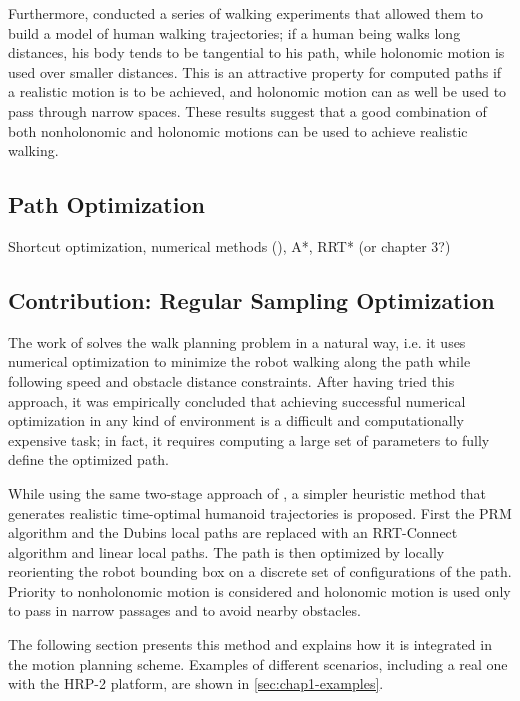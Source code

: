 Furthermore, \cite{momb10} conducted a series of walking experiments
that allowed them to build a model of human walking trajectories; if a
human being walks long distances, his body tends to be tangential to
his path, while holonomic motion is used over smaller distances. This
is an attractive property for computed paths if a realistic motion is
to be achieved, and holonomic motion can as well be used to pass
through narrow spaces. These results suggest that a good combination
of both nonholonomic and holonomic motions can be used to achieve
realistic walking.

\subsection{Path Optimization}
\label{subsec:chap1-path-optimization}

Shortcut optimization, numerical methods (), A*, RRT* (or chapter 3?)

\subsection{Contribution: Regular Sampling Optimization}
\label{subsec:chap1-contribution}
The work of \cite{moul10} solves the walk planning problem
in a natural way, i.e. it uses numerical optimization to minimize the
robot walking along the path while following speed and obstacle
distance constraints. After having tried this approach, it was
empirically concluded that achieving successful numerical optimization
in any kind of environment is a difficult and computationally
expensive task; in fact, it requires computing a large set of
parameters to fully define the optimized path.

While using the same two-stage approach of \cite{yosh08}, a simpler
heuristic method that generates realistic time-optimal humanoid
trajectories is proposed. First the PRM algorithm and the Dubins local
paths are replaced with an RRT-Connect algorithm and linear local
paths. The path is then optimized by locally reorienting the robot
bounding box on a discrete set of configurations of the path. Priority
to nonholonomic motion is considered and holonomic motion is used only
to pass in narrow passages and to avoid nearby obstacles.

The following section presents this method and explains how it is
integrated in the motion planning scheme. Examples of different
scenarios, including a real one with the HRP-2 platform, are shown in
\autoref{sec:chap1-examples}.

